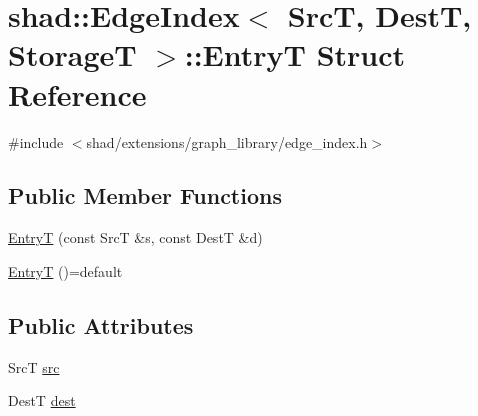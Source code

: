\hypertarget{structshad_1_1EdgeIndex_1_1EntryT}{\section{shad\-:\-:Edge\-Index$<$ Src\-T, Dest\-T, Storage\-T $>$\-:\-:Entry\-T Struct Reference}
\label{structshad_1_1EdgeIndex_1_1EntryT}
}


{\ttfamily \#include $<$shad/extensions/graph\-\_\-library/edge\-\_\-index.\-h$>$}

\subsection*{Public Member Functions}
\begin{DoxyCompactItemize}
\item 
\hyperlink{structshad_1_1EdgeIndex_1_1EntryT_a47eb1cc293a63bee60332c8cb28755b1}{Entry\-T} (const Src\-T \&s, const Dest\-T \&d)
\item 
\hyperlink{structshad_1_1EdgeIndex_1_1EntryT_a9c2dec91f8a956742d18116cf6c0eb73}{Entry\-T} ()=default
\end{DoxyCompactItemize}
\subsection*{Public Attributes}
\begin{DoxyCompactItemize}
\item 
Src\-T \hyperlink{structshad_1_1EdgeIndex_1_1EntryT_a9437ab5481f5db7a277d9c26ecfe1b70}{src}
\item 
Dest\-T \hyperlink{structshad_1_1EdgeIndex_1_1EntryT_a538cbbeef35115be233a1f5a4d700c93}{dest}
\end{DoxyCompactItemize}


